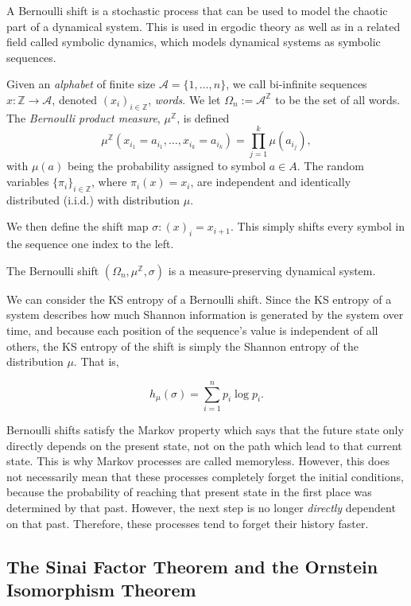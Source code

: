 \documentclass{article}
\begin{document}
A Bernoulli shift is a stochastic process that can be used to model the chaotic part of a dynamical system. This is used in ergodic theory as well as in a related field called symbolic dynamics, which models dynamical systems as symbolic sequences. 

Given an \emph{alphabet} of finite size $\mathcal{A}=\{1,\dots, n\}$, we call bi-infinite sequences $x:\mathbb{Z}\to\mathcal{A}$, denoted $(x_i)_{i\in\mathbb{Z}}$, \emph{words}. We let $\Omega_n:=\mathcal{A}^\mathbb{Z}$ to be the set of all words. The \emph{Bernoulli product measure}, \( \mu^\mathbb{Z} \), is defined
    \[
    \mu^\mathbb{Z}(x_{i_1} = a_{i_1}, \dots, x_{i_k} = a_{i_k}) = \prod_{j=1}^k \mu(a_{i_j}),
    \]
    with \( \mu(a) \) being the probability assigned to symbol \( a \in A \). The random variables \( \{\pi_i\}_{i \in \mathbb{Z}} \), where \( \pi_i(x) = x_i \), are independent and identically distributed (i.i.d.) with distribution \( \mu \).

We then define the shift map $\sigma:(x)_i=x_{i+1}$. This simply shifts every symbol in the sequence one index to the left.

The Bernoulli shift \( (\Omega_n,\mu^\mathbb{Z}, \sigma) \) is a measure-preserving dynamical system. 

We can consider the KS entropy of a Bernoulli shift. Since the KS entropy of a system describes how much Shannon information is generated by the system over time, and because each position of the sequence's value is independent of all others, the KS entropy of the shift is simply the Shannon entropy of the distribution $\mu$. That is,

\[ h_\mu(\sigma) = \sum_{i=1}^n p_i\log p_i. \]

Bernoulli shifts satisfy the Markov property which says that the future state only directly depends on the present state, not on the path which lead to that current state. This is why Markov processes are called memoryless. However, this does not necessarily mean that these processes completely forget the initial conditions, because the probability of reaching that present state in the first place was determined by that past. However, the next step is no longer \emph{directly} dependent on that past. Therefore, these processes tend to forget their history faster. 

\subsection{The Sinai Factor Theorem and the Ornstein Isomorphism Theorem}
\end{document}
